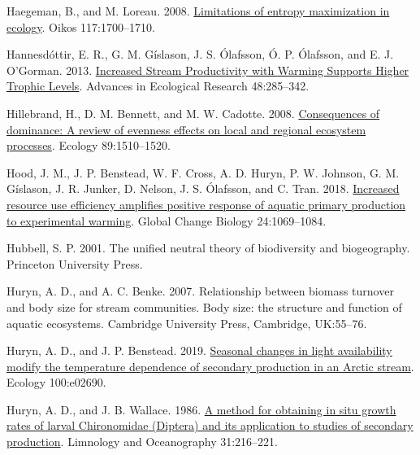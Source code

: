 \documentclass[
]{article}
\newlength{\cslhangindent}
\newlength{\cslentryspacingunit} %
\newenvironment{CSLReferences}[2] %
 {%
  \setlength{\parindent}{0pt}
  \ifodd #1
  \let\oldpar\par
  \def\par{\hangindent=\cslhangindent\oldpar}
  \fi
  \setlength{\parskip}{#2\cslentryspacingunit}
 }%
 {}
\numberwithin{equation}
\begin{document}
\begin{CSLReferences}{1}{0}
\leavevmode{}%
Haegeman, B., and M. Loreau. 2008.
\href{https://doi.org/10.1111/j.1600-0706.2008.16539.x}{Limitations of
entropy maximization in ecology}. Oikos 117:1700--1710.

\leavevmode{}%
Hannesdóttir, E. R., G. M. Gíslason, J. S. Ólafsson, Ó. P. Ólafsson, and
E. J. O'Gorman. 2013.
\href{https://doi.org/10.1016/B978-0-12-417199-2.00005-7}{Increased
{Stream Productivity} with {Warming Supports Higher Trophic Levels}}.
Advances in Ecological Research 48:285--342.

\leavevmode{}%
Hillebrand, H., D. M. Bennett, and M. W. Cadotte. 2008.
\href{https://doi.org/10.1890/07-1053.1}{Consequences of dominance: A
review of evenness effects on local and regional ecosystem processes}.
Ecology 89:1510--1520.

\leavevmode{}%
Hood, J. M., J. P. Benstead, W. F. Cross, A. D. Huryn, P. W. Johnson, G.
M. Gíslason, J. R. Junker, D. Nelson, J. S. Ólafsson, and C. Tran. 2018.
\href{https://doi.org/10.1111/gcb.13912}{Increased resource use
efficiency amplifies positive response of aquatic primary production to
experimental warming}. Global Change Biology 24:1069--1084.

\leavevmode{}%
Hubbell, S. P. 2001. The unified neutral theory of biodiversity and
biogeography. Princeton University Press.

\leavevmode{}%
Huryn, A. D., and A. C. Benke. 2007. Relationship between biomass
turnover and body size for stream communities. Body size: the structure
and function of aquatic ecosystems. Cambridge University Press,
Cambridge, UK:55--76.

\leavevmode{}%
Huryn, A. D., and J. P. Benstead. 2019.
\href{https://doi.org/10.1002/ecy.2690}{Seasonal changes in light
availability modify the temperature dependence of secondary production
in an {Arctic} stream}. Ecology 100:e02690.

\leavevmode{}%
Huryn, A. D., and J. B. Wallace. 1986.
\href{https://doi.org/10.4319/lo.1986.31.1.0216}{A method for obtaining
in situ growth rates of larval {Chironomidae} ({Diptera}) and its
application to studies of secondary production}. Limnology and
Oceanography 31:216--221.


\end{CSLReferences}
\end{document}
